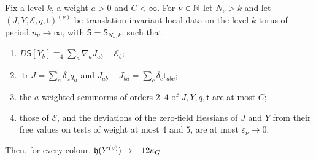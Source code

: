 \begin{lemma}\label{lem:I-regulator}
Fix a level $k$, a weight $a>0$ and $C<\infty$. For $\nu\in\mathbb{N}$ let $N_\nu>k$ and let $(J,Y,\mathcal E,q,\mathsf t)^{(\nu)}$ be translation-invariant local data on the level-$k$ torus of period $n_\nu\to\infty$, with $\mathsf S=\mathsf S_{N_\nu,k}$, such that
\begin{enumerate}[label=(\alph*)]
\item $D\mathsf S[Y_b]\equiv_4\sum_a\nabla_aJ_{ab}-\mathcal E_b$;
\item $\operatorname{tr}J=\sum_a\delta_aq_a$ and $J_{ab}-J_{ba}=\sum_c\delta_c\mathsf t_{abc}$;
\item the $a$-weighted seminorms of orders $2$--$4$ of $J,Y,q,\mathsf t$ are at most $C$;
\item those of $\mathcal E$, and the deviations of the zero-field Hessians of $J$ and $Y$ from their free values on tests of weight at most $4$ and $5$, are at most $\varepsilon_\nu\to0$.
\end{enumerate}
Then, for every colour, $\mathfrak h(Y^{(\nu)})\to-12\kappa_G$.
\end{lemma}
